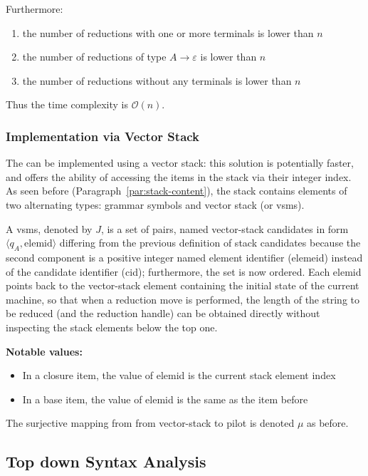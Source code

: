 \documentclass[english]{article}
\begin{document}
Furthermore:
\begin{enumerate}
  \item the number of reductions with one or more terminals is lower than \(n\)
  \item the number of reductions of type \(A \rightarrow \varepsilon\) is lower than \(n\)
  \item the number of reductions without any terminals is lower than \(n\)
\end{enumerate}

Thus the time complexity is \(\mathcal{O}(n)\).

\subsubsection{Implementation via Vector Stack}

The \PDA can be implemented using a vector stack: this solution is potentially faster, and offers the ability of accessing the items in the stack via their integer index.
As seen before (Paragraph~\ref{par:stack-content}), the stack contains elements of two alternating types: grammar symbols and vector stack \mstates (or vsms).

A vsms, denoted by \(J\), is a set of pairs, named vector-stack candidates in form \(\langle q_A, \text{elemid} \rangle\) differing from the previous definition of stack candidates because the second component is a positive integer named element identifier (elemeid) instead of the candidate identifier (cid);
furthermore, the set is now ordered.
Each elemid points back to the vector-stack element containing the initial state of the current machine, so that when a reduction move is performed, the length of the string to be reduced (and the reduction handle) can be obtained directly without inspecting the stack elements below the top one.

\textbf{Notable values:}
\begin{itemize}
  \item In a closure item, the value of elemid is the current stack element index
  \item In a base item, the value of elemid is the same as the item before
\end{itemize}


\bigskip
The surjective mapping from from vector-stack \mstates to pilot \mstates is denoted \(\mu\) as before.


\subsection{Top down Syntax Analysis}
\label{sec:top-down}
\end{document}
